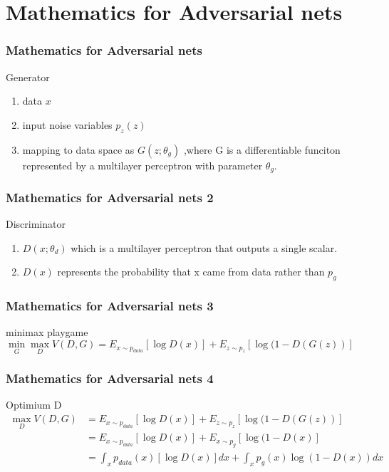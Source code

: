 \documentclass{beamer}
\begin{document}
\section{Mathematics for Adversarial nets}
\begin{frame}
  \frametitle{Mathematics for Adversarial nets}
  \begin{block}{Generator}
  \begin{enumerate}
    \item data $x$
    \item input noise variables $p_z(z)$
    \item mapping to data space as $G(z;\theta_g)$ ,where G is a differentiable funciton represented by a multilayer perceptron with parameter $\theta_g$.
  \end{enumerate}
\end{block}
\end{frame}

\begin{frame}
  \frametitle{Mathematics for Adversarial nets 2}
  \begin{block}{Discriminator}
  \begin{enumerate}
    \item $D(x;\theta_d)$ which is a multilayer perceptron that outputs a single scalar.
    \item $D(x)$ represents the probability that x came from data rather than $p_g$
  \end{enumerate}
  \end{block}
\end{frame}

\begin{frame}
  \frametitle{Mathematics for Adversarial nets 3}
  \begin{block}{minimax playgame}
    $\min \limits_{G} \max \limits_{D} V(D,G) = E_{x \sim p_{data}}[\log D(x)] + E_{z \sim p_z}[\log (1 - D(G(z))] $
  \end{block}
\end{frame}

\begin{frame}
  \frametitle{Mathematics for Adversarial nets 4}
  \begin{block}{Optimium D }
    \begin{align}
    \max \limits_{D} V(D,G) &= E_{x \sim p_{data}}[\log D(x)] + E_{z \sim p_z}[\log (1 - D(G(z))]  \\
                            &= E_{x \sim p_{data}}[\log D(x)] + E_{x \sim p_g}[\log (1 - D(x)]     \\
			    &= \int_{x} p_{data}(x)[\log D(x)] dx + \int_{x} p_g(x) \log (1 - D(x)) dx 
    \end{align}
  \end{block}
\end{frame}
\end{document}
